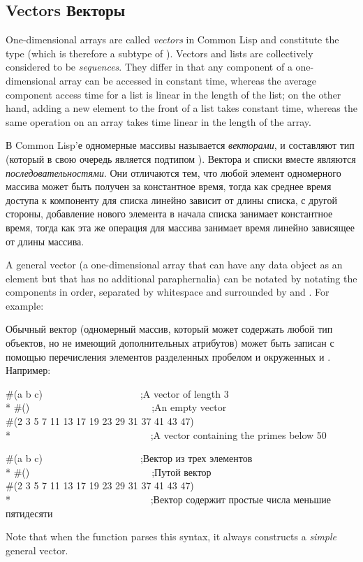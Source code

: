 \subsection{Vectors Векторы}

One-dimensional arrays are called {\it vectors} in Common Lisp
and constitute the type  (which is therefore a subtype of ).
Vectors and lists are collectively considered to be
{\it sequences}.  They differ in that any component of a one-dimensional array
can be accessed in constant time,
whereas the average component access time for a
list is linear in the length of the list; on the other hand, adding a new
element to the front of a list takes constant time, whereas the same
operation on an array takes time linear in the length of the array.

В Common Lisp'е одномерные массивы называется {\it векторами}, и составляют тип
 (который в свою очередь является подтипом ).
Вектора и списки вместе являются {\it последовательностями}. Они отличаются тем,
что любой элемент одномерного массива может быть получен за константное время,
тогда как среднее время доступа к компоненту для списка линейно зависит от длины
списка, с другой стороны, добавление нового элемента в начала списка занимает
константное время, тогда как эта же операция для массива занимает время линейно
зависящее от длины массива.

A general vector (a one-dimensional array
that can have any data object as an element but that has
no additional paraphernalia) can be notated by notating the
components in order, separated by whitespace and surrounded by \cd{\#(}
and \cd{)}.
For example:

Обычный вектор (одномерный массив, который может содержать любой тип объектов,
но не имеющий дополнительных атрибутов) может быть записан с помощью
перечисления элементов разделенных пробелом и окруженных \cd{\#(} и
\cd{)}.
Например:
\begin{lisp}
\#(a b c)~~~~~~~~~~~~~~~~~~~~;{\rm A vector of length 3} \\*
\#()~~~~~~~~~~~~~~~~~~~~~~~~~;{\rm An empty vector} \\
\#(2 3 5 7 11 13 17 19 23 29 31 37 41 43 47) \\*
~~~~~~~~~~~~~~~~~~~~~~~~~~~~;{\rm A vector containing the primes below 50}
\end{lisp}

\begin{lisp}
\#(a b c)~~~~~~~~~~~~~~~~~~~~;{\rm Вектор из трех элементов} \\*
\#()~~~~~~~~~~~~~~~~~~~~~~~~~;{\rm Путой вектор} \\
\#(2 3 5 7 11 13 17 19 23 29 31 37 41 43 47) \\*
~~~~~~~~~~~~~~~~~~~~~~~~~~~~;{\rm Вектор содержит простые числа меньшие пятидесяти}
\end{lisp}
Note that when the function  parses this syntax, it always constructs
a {\it simple} general vector.

